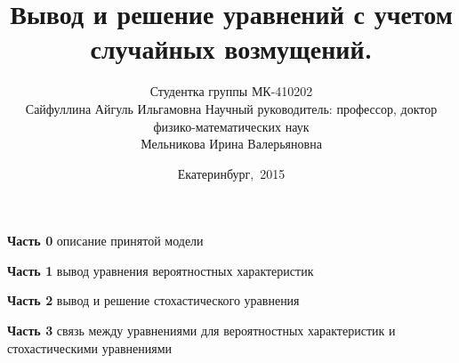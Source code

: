 \documentclass[notes,compress]{beamer}
\title
      {{Вывод и решение уравнений с учетом случайных возмущений.}}
\author{Студентка группы МК-410202 \\
 Сайфуллина Айгуль Ильгамовна \newline
 \newline
Научный руководитель: профессор, доктор физико-математических наук \\
Мельникова Ирина Валерьяновна \\}
\institute{Уральский федеральный университет}
\date{Екатеринбург,~2015}
\begin{document}

%
\frame{\titlepage}


 \LogoOff





\begin{frame}

{\textbf{Часть 0}} описание принятой модели \newline

{\textbf{Часть 1}} вывод уравнения вероятностных характеристик \newline

{\textbf{Часть 2}} вывод и решение стохастического уравнения \newline

{\textbf{Часть 3}} связь между уравнениями для вероятностных характеристик и стохастическими уравнениями

\end{frame}
\end{document}
